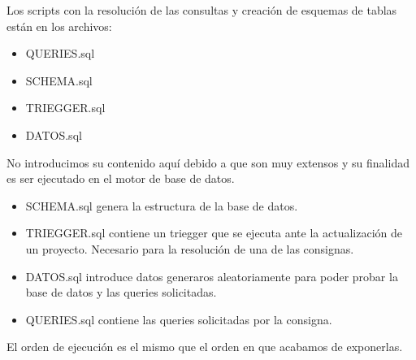 Los scripts con la resoluci\'on de las consultas y creaci\'on de esquemas de tablas est\'an en los archivos:

\begin{itemize}

	\item QUERIES.sql
	\item SCHEMA.sql
	\item TRIEGGER.sql
	\item DATOS.sql

\end{itemize}

No introducimos su contenido aqu\'i debido a que son muy extensos y su finalidad es ser ejecutado en el motor de base de datos. 

\begin{itemize}
	\item SCHEMA.sql genera la estructura de la base de datos.
	\item TRIEGGER.sql contiene un triegger que se ejecuta ante la actualizaci\'on de un proyecto. Necesario para la resoluci\'on de una de las consignas.
	\item DATOS.sql introduce datos generaros aleatoriamente para poder probar la base de datos y las queries solicitadas.
	\item QUERIES.sql contiene las queries solicitadas por la consigna.
\end{itemize}
El orden de ejecuci\'on es el mismo que el orden en que acabamos de exponerlas.